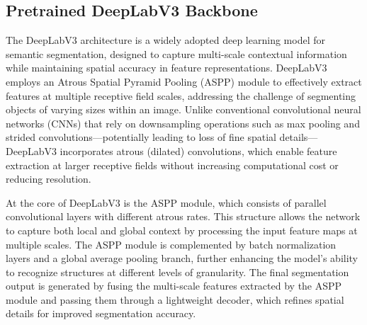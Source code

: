 \documentclass[journal]{IEEEtran}
\begin{document}
\subsection{Pretrained DeepLabV3 Backbone}
The DeepLabV3 \cite{chen2017rethinking} architecture is a widely adopted deep learning model for semantic segmentation, designed to capture multi-scale contextual information while maintaining spatial accuracy in feature representations. DeepLabV3 employs an Atrous Spatial Pyramid Pooling (ASPP) module to effectively extract features at multiple receptive field scales, addressing the challenge of segmenting objects of varying sizes within an image. Unlike conventional convolutional neural networks (CNNs) that rely on downsampling operations such as max pooling and strided convolutions—potentially leading to loss of fine spatial details—DeepLabV3 incorporates atrous (dilated) convolutions, which enable feature extraction at larger receptive fields without increasing computational cost or reducing resolution.

At the core of DeepLabV3 is the ASPP module, which consists of parallel convolutional layers with different atrous rates. This structure allows the network to capture both local and global context by processing the input feature maps at multiple scales. The ASPP module is complemented by batch normalization layers and a global average pooling branch, further enhancing the model's ability to recognize structures at different levels of granularity. The final segmentation output is generated by fusing the multi-scale features extracted by the ASPP module and passing them through a lightweight decoder, which refines spatial details for improved segmentation accuracy.
\end{document}
